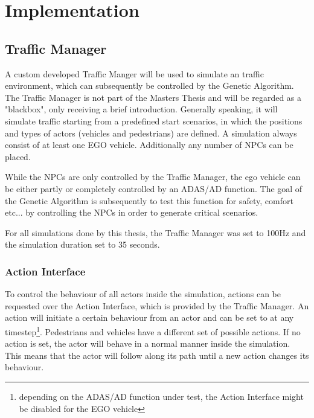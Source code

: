 \chapter{Implementation}
\label{chap:implementation}
\section{Traffic Manager}
A custom developed Traffic Manger will be used to simulate an traffic environment, which can subsequently be controlled by the Genetic Algorithm. The Traffic Manager is not part of the Masters Thesis and will be regarded as a "blackbox", only receiving a brief introduction.
Generally speaking, it will simulate traffic starting from a predefined start scenarios, in which the positions and types of actors (vehicles and pedestrians) are defined. 
A simulation always consist of at least one EGO vehicle. Additionally any number of NPCs can be placed.

While the NPCs are only controlled by the Traffic Manager, the ego vehicle can be either partly or completely controlled by an ADAS/AD function. The goal of the Genetic Algorithm is subsequently to test this function for safety, comfort etc... by controlling the NPCs in order to generate critical scenarios.

For all simulations done by this thesis, the Traffic Manager was set to 100Hz and the simulation duration set to 35 seconds.

\subsection{Action Interface}
\label{implementation:action_interface}
To control the behaviour of all actors inside the simulation, actions can be requested over the Action Interface, which is provided by the Traffic Manager. An action will initiate a certain behaviour from an actor and can be set to at any timestep\footnote{depending on the ADAS/AD function under test, the Action Interface might be disabled for the EGO vehicle}. Pedestrians and vehicles have a different set of possible actions. If no action is set, the actor will behave in a normal manner inside the simulation. This means that the actor will follow along its path until a new action changes its behaviour.

